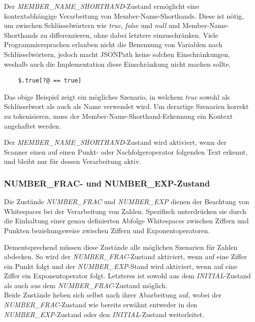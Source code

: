 \documentclass[oneside]{ausarbeitung}
\begin{document}
Der \textit{MEMBER\_NAME\_SHORTHAND}-Zustand ermöglicht eine kontextabhängige Verarbeitung von Member-Name-Shorthands. Diese ist nötig, um zwischen Schlüsselwörtern wie \textit{true}, \textit{false} und \textit{null} und Member-Name-Shorthands zu differenzieren, ohne dabei letztere einzuschränken. Viele Programmiersprachen erlauben nicht die Benennung von Variablen nach Schlüsselwörtern, jedoch macht JSONPath keine solchen Einschränkungen, weshalb auch die Implementation diese Einschränkung nicht machen sollte.

\begin{lstlisting}
	$.true[?@ == true]
\end{lstlisting}

Das obige Beispiel zeigt ein mögliches Szenario, in welchem \textit{true} sowohl als Schlüsselwort als auch als Name verwendet wird. Um derartige Szenarien korrekt zu tokenisieren, muss der Member-Name-Shorthand-Erkennung ein Kontext angehaftet werden.

Der \textit{MEMBER\_NAME\_SHORTHAND}-Zustand wird aktiviert, wenn der Scanner einen auf einen Punkt- oder Nachfolgeroperator folgenden Text erkennt, und bleibt nur für dessen Verarbeitung aktiv.



\pagebreak

\subsubsection{NUMBER\_FRAC- und NUMBER\_EXP-Zustand}

Die Zustände \textit{NUMBER\_FRAC} und \textit{NUMBER\_EXP} dienen der Beachtung von Whitespaces bei der Verarbeitung von Zahlen. Spezifisch unterdrücken sie durch die Einhaltung einer genau definierten Abfolge Whitespaces zwischen Ziffern und Punkten beziehungsweise zwischen Ziffern und Exponentoperatoren. 

Dementsprechend müssen diese Zustände alle möglichen Szenarien für Zahlen abdecken. So wird der \textit{NUMBER\_FRAC}-Zustand aktiviert, wenn auf eine Ziffer ein Punkt folgt und der \textit{NUMBER\_EXP}-Stand wird aktiviert, wenn auf eine Ziffer ein Exponentoperator folgt. Letzteres ist sowohl aus dem \textit{INITIAL}-Zustand als auch aus dem \textit{NUMBER\_FRAC}-Zustand möglich. \\
Beide Zustände heben sich selbst nach ihrer Abarbeitung auf, wobei der \textit{NUMBER\_FRAC}-Zustand wie bereits erwähnt entweder in den \textit{NUMBER\_EXP}-Zustand oder den \textit{INITIAL}-Zustand weiterleitet.
\end{document}
